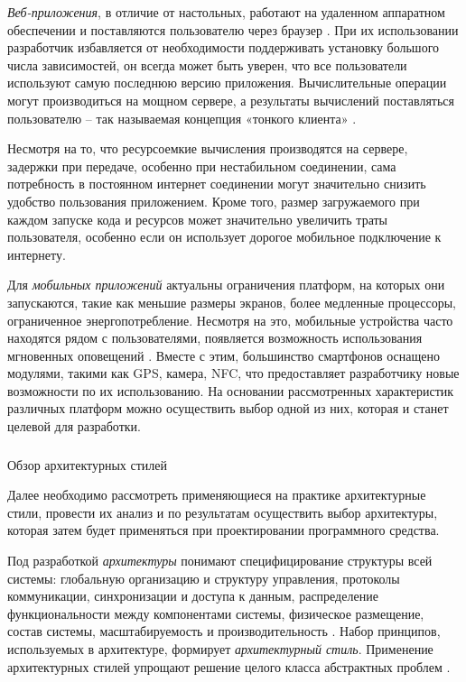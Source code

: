 \emph{Веб-приложения}, в отличие от настольных, работают на удаленном аппаратном обеспечении и поставляются пользователю через браузер \cite{web_based_vs_desktop}. При
их использовании разработчик избавляется от необходимости поддерживать
установку большого числа зависимостей, он всегда может быть уверен, что
все пользователи используют самую последнюю версию приложения. Вычислительные операции могут производиться на мощном сервере, а результаты
вычислений поставляться пользователю – так называемая концепция «тонкого
клиента» \cite{desktop_vs_web_deeper_look}.

Несмотря на то, что ресурсоемкие вычисления производятся на сервере,
задержки при передаче, особенно при нестабильном соединении, сама потребность в постоянном интернет соединении могут значительно снизить удобство
пользования приложением. Кроме того, размер загружаемого при каждом запуске кода и ресурсов может значительно увеличить траты пользователя, особенно если он использует 
дорогое мобильное подключение к интернету.

Для \emph{мобильных приложений} актуальны ограничения платформ, на которых они запускаются, такие как меньшие размеры экранов, более медленные процессоры, 
ограниченное энергопотребление. Несмотря на это, мобильные устройства часто находятся рядом с пользователями, появляется возможность использования 
мгновенных оповещений \cite{desktop_mobile_differences}. Вместе с этим, большинство смартфонов оснащено модулями, такими как GPS, камера, NFC, 
что предоставляет разработчику новые возможности по их использованию.
На основании рассмотренных характеристик различных платформ можно
осуществить выбор одной из них, которая и станет целевой для разработки.

\subsubsection{} Обзор архитектурных стилей
\label{sec:analysis:literature:architecture_styles}

Далее необходимо рассмотреть применяющиеся на практике архитектурные стили, провести их анализ и по результатам осуществить выбор архитектуры, которая затем будет 
применяться при проектировании программного средства.

Под разработкой \emph{архитектуры} понимают специфицирование структуры
всей системы: глобальную организацию и структуру управления, протоколы
коммуникации, синхронизации и доступа к данным, распределение функциональности между компонентами системы, физическое размещение, состав системы, масштабируемость и 
производительность \cite{introduction_to_architecture}. Набор принципов, используемых в архитектуре, формирует \emph{архитектурный стиль}. Применение архитектурных 
стилей упрощают решение целого класса абстрактных проблем \cite{introduction_to_architecture}.


